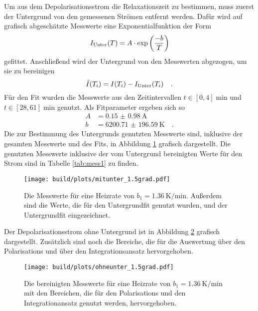 \noindent
Um aus dem Depolarisationsstrom die Relaxationszeit zu bestimmen, muss zuerst der Untergrund von den gemessenen Strömen entfernt werden.
Dafür wird auf grafisch abgeschätzte Messwerte eine Exponentialfunktion der Form
\begin{equation}
  I_{\text{Unter}}(T) = A\cdot \exp\left(\frac{-b}{T}\right)
  \label{eqn:exp}
\end{equation}
gefittet. Anschließend wird der Untergrund von den Messwerten abgezogen, um sie zu bereinigen
\begin{equation*}
  \tilde{I}(T_i) = I(T_i) - I_{\text{Unter}}(T_i) \quad.
\end{equation*}
Für den Fit wurden die Messwerte aus den Zeitintervallen $t \in [0,4] \; \si{\minute}$ und $t \in [28,61] \; \si{\minute}$ genutzt.
Als Fitparameter ergeben sich so 
\begin{align*}
  A &= \SI{0.15(098)}{\ampere}\\
  b &= \SI{6200.71(19659)}{\kelvin} \quad .
\end{align*}
Die zur Bestimmung des Untergrunds genutzten Messwerte sind,
inklusive der gesamten Messwerte und des Fits, in Abbildung \ref{img:mitunter15} grafisch dargestellt. 
Die genutzten Messwerte inklusive der vom Untergrund bereinigten Werte für den Strom sind in Tabelle \ref{tab:mess1} zu finden.
\begin{figure}[h]
  \centering
  \texttt{[image: build/plots/mitunter\_1.5grad.pdf]}
  \caption{Die Messwerte für eine Heizrate von $b_1 = \SI{1.36}{\kelvin\per\minute}$. 
  Außerdem sind die Werte, die für den Untergrundfit genutzt wurden, und der Untergrundfit eingezeichnet.}
  \label{img:mitunter15}
\end{figure}

\noindent
Der Depolarisationsstrom ohne Untergrund ist in Abbildung \ref{img:ohneunter15} grafisch dargestellt. 
Zusätzlich sind noch die Bereiche, die für die Auswertung über den Polarisations und über den Integrationsansatz hervorgehoben.
\begin{figure}[H]
  \centering
  \texttt{[image: build/plots/ohneunter\_1.5grad.pdf]}
  \caption{Die bereinigten Messwerte für eine Heizrate von $b_1 = \SI{1.36}{\kelvin\per\minute}$ 
          mit den Bereichen, die für den Polarisations und den Integrationansatz genutzt werden, hervorgehoben.}
  \label{img:ohneunter15}
\end{figure}

